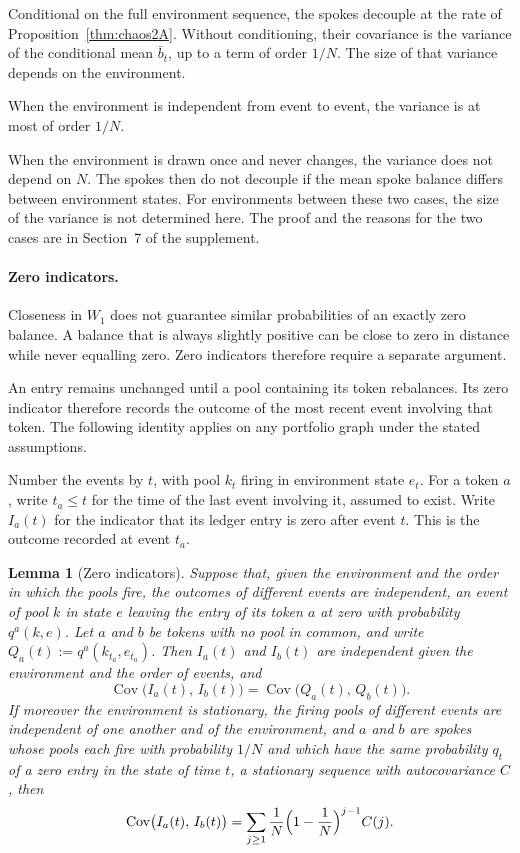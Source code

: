 \documentclass[11pt,a4paper]{article}
\theoremstyle{siphon}
\newtheorem{lemma}{Lemma}
\begin{document}
\noindent Conditional on the full environment sequence, the spokes decouple at the rate of Proposition~\ref{thm:chaos2A}. Without conditioning, their covariance is the variance of the conditional mean $\bar b_t$, up to a term of order $1/N$. The size of that variance depends on the environment.

When the environment is independent from event to event, the variance is at most of order $1/N$.

When the environment is drawn once and never changes, the variance does not depend on $N$. The spokes then do not decouple if the mean spoke balance differs between environment states. For environments between these two cases, the size of the variance is not determined here. The proof and the reasons for the two cases are in Section~7 of the supplement.

\paragraph{Zero indicators.}
Closeness in $W_1$ does not guarantee similar probabilities of an exactly zero balance. A balance that is always slightly positive can be close to zero in distance while never equalling zero. Zero indicators therefore require a separate argument.

An entry remains unchanged until a pool containing its token rebalances. Its zero indicator therefore records the outcome of the most recent event involving that token. The following identity applies on any portfolio graph under the stated assumptions.

Number the events by $t$, with pool $k_t$ firing in environment state $e_t$. For a token $a$, write $t_a \leq t$ for the time of the last event involving it, assumed to exist. Write $I_a(t)$ for the indicator that its ledger entry is zero after event $t$. This is the outcome recorded at event $t_a$.

\begin{lemma}[Zero indicators]\label{lem:indicators}
Suppose that, given the environment and the order in which the pools fire, the outcomes of different events are independent, an event of pool $k$ in state $e$ leaving the entry of its token $a$ at zero with probability $q^a(k, e)$. Let $a$ and $b$ be tokens with no pool in common, and write $Q_a(t) := q^a(k_{t_a}, e_{t_a})$. Then $I_a(t)$ and $I_b(t)$ are independent given the environment and the order of events, and
\[
\operatorname{Cov}\bigl(I_a(t),\,I_b(t)\bigr)  =  \operatorname{Cov}\bigl(Q_a(t),\,Q_b(t)\bigr) .
\]
If moreover the environment is stationary, the firing pools of different events are independent of one another and of the environment, and $a$ and $b$ are spokes whose pools each fire with probability $1/N$ and which have the same probability $q_t$ of a zero entry in the state of time $t$, a stationary sequence with autocovariance $C$, then
\[
\operatorname{Cov}\bigl(I_a(t),\,I_b(t)\bigr)  =  \sum_{j \geq 1} \frac{1}{N}\Bigl(1 - \frac{1}{N}\Bigr)^{j-1} C(j) .
\]
\end{lemma}
\end{document}
